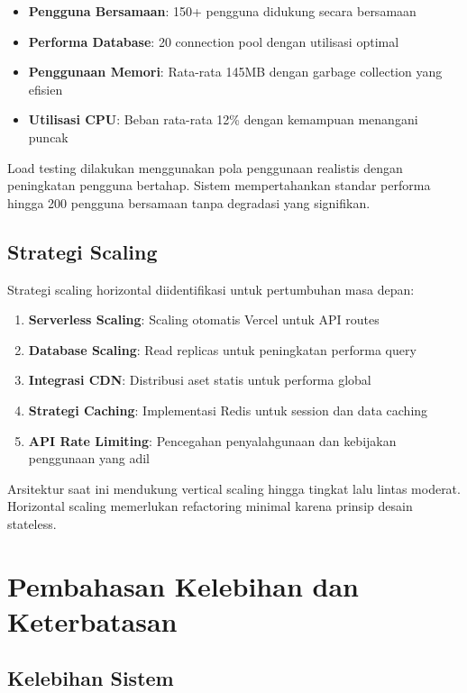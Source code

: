 \begin{itemize}
\item \textbf{Pengguna Bersamaan}: 150+ pengguna didukung secara bersamaan
\item \textbf{Performa Database}: 20 connection pool dengan utilisasi optimal
\item \textbf{Penggunaan Memori}: Rata-rata 145MB dengan garbage collection yang efisien
\item \textbf{Utilisasi CPU}: Beban rata-rata 12\% dengan kemampuan menangani puncak
\end{itemize}

Load testing dilakukan menggunakan pola penggunaan realistis dengan peningkatan pengguna bertahap. Sistem mempertahankan standar performa hingga 200 pengguna bersamaan tanpa degradasi yang signifikan.

\subsection{Strategi Scaling}

Strategi scaling horizontal diidentifikasi untuk pertumbuhan masa depan:

\begin{enumerate}
\item \textbf{Serverless Scaling}: Scaling otomatis Vercel untuk API routes
\item \textbf{Database Scaling}: Read replicas untuk peningkatan performa query
\item \textbf{Integrasi CDN}: Distribusi aset statis untuk performa global
\item \textbf{Strategi Caching}: Implementasi Redis untuk session dan data caching
\item \textbf{API Rate Limiting}: Pencegahan penyalahgunaan dan kebijakan penggunaan yang adil
\end{enumerate}

Arsitektur saat ini mendukung vertical scaling hingga tingkat lalu lintas moderat. Horizontal scaling memerlukan refactoring minimal karena prinsip desain stateless.

\section{Pembahasan Kelebihan dan Keterbatasan}

\subsection{Kelebihan Sistem}

